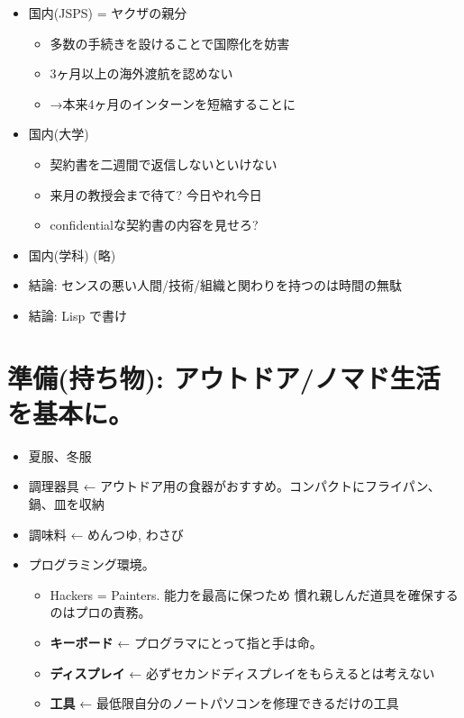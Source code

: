 \begin{itemize}
\item 国内(JSPS) = ヤクザの親分
\begin{itemize}
\item 多数の手続きを設けることで国際化を妨害
\item 3ヶ月以上の海外渡航を認めない
\item →本来4ヶ月のインターンを短縮することに
\end{itemize}
\item 国内(大学)
\begin{itemize}
\item 契約書を二週間で返信しないといけない
\item 来月の教授会まで待て? 今日やれ今日
\item confidentialな契約書の内容を見せろ?
\end{itemize}
\item 国内(学科) (略)

\item 結論: センスの悪い人間/技術/組織と関わりを持つのは時間の無駄

\item 結論: Lisp で書け
\end{itemize}

\section{準備(持ち物): アウトドア/ノマド生活を基本に。}
\label{sec-6}

\begin{itemize}
\item 夏服、冬服
\item 調理器具 ← アウトドア用の食器がおすすめ。コンパクトにフライパン、鍋、皿を収納
\item 調味料 ← めんつゆ, わさび
\item プログラミング環境。
\begin{itemize}
\item Hackers = Painters. 能力を最高に保つため 慣れ親しんだ道具を確保するのはプロの責務。
\item \textbf{キーボード} ← プログラマにとって指と手は命。
\item \textbf{ディスプレイ} ← 必ずセカンドディスプレイをもらえるとは考えない
\item \textbf{工具} ← 最低限自分のノートパソコンを修理できるだけの工具
\end{itemize}
\end{itemize}

